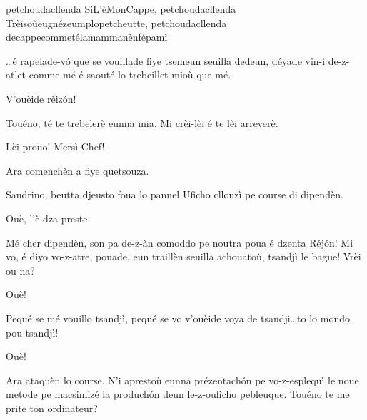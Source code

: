 \begin{drama}

\Saventaspeaks{} petchoudacllenda SiL'èMonCappe, petchoudacllenda Trèisoùeugnézeumplopetcheutte, petchoudacllenda decappecommetélamammanènfépamì

\Treisouspeaks \ldots é rapelade-v\'o que se vouillade fiye tsemeun seuilla dedeun, déyade vin-ì de-z-atlet comme mé é saouté lo trebeillet mioù que mé. 

\Richardspeaks V'ouèide rèiz\'on! 

\Treisouspeaks{} Touéno, té te trebelerè eunna mia. Mi crèi-lèi é te lèi arreverè.

\Tuenospeaks Lèi prouo! Mersì Chef!

\Treisouspeaks Ara comenchèn a fiye quetsouza.



\Treisouspeaks{} Sandrino, beutta djeusto foua lo pannel  \og Uficho cllouzì pe course di dipendèn\fg.

\Sandrinospeaks Ouè, l’è dza preste.



\Treisouspeaks Mé cher dipendèn, son pa de-z-àn comoddo pe noutra poua é dzenta Réj\'on!
Mi vo, é diyo vo-z-atre, pouade, eun traillèn seuilla achouatoù, tsandjì le bague! Vrèi ou na?

\Tcheuttespeaks{} Ouè!

\Treisouspeaks Pequé se mé vouillo tsandjì, pequé se vo v'ouèide voya de tsandjì\ldots to lo mondo pou tsandjì!

\Tcheuttespeaks{} Ouè!

\Treisouspeaks Ara ataquèn lo course. N'i aprestoù eunna prézentach\'on pe vo-z-esplequì le noue metode pe macsimizé la produch\'on deun le-z-ouficho pebleuque.  Touéno te me prite ton ordinateur?



\end{drama}
